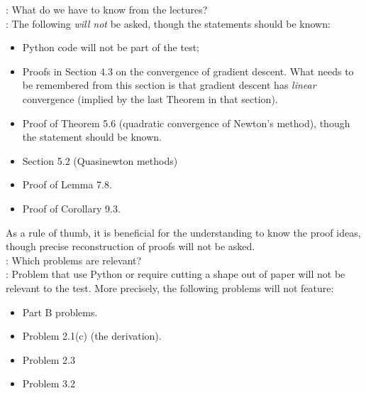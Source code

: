 \documentclass[11pt,a4paper]{memoir}
\begin{document}
: What do we have to know from the lectures?\\

: The following {\em will not} be asked, though the statements should be known:
\begin{itemize}
\item Python code will not be part of the test;
\item Proofs in Section 4.3 on the convergence of gradient descent. What needs to be remembered from this section is that gradient descent has {\em linear} convergence (implied by the last Theorem in that section).
\item Proof of Theorem 5.6 (quadratic convergence of Newton's method), though the statement should be known.
\item Section 5.2 (Quasinewton methods)
\item Proof of Lemma 7.8.
\item Proof of Corollary 9.3.
\end{itemize}

As a rule of thumb, it is beneficial for the understanding to know the proof ideas, though precise reconstruction of proofs will not be asked.\\

: Which problems are relevant?\\

: Problem that use Python or require cutting a shape out of paper will not be relevant to the test. More precisely, the following problems will not feature:

\begin{itemize}
\item Part B problems.
\item Problem 2.1(c) (the derivation).
\item Problem 2.3
\item Problem 3.2
\end{itemize}


%

%

%
%
\end{document}
